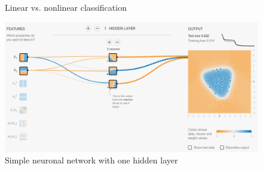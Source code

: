 \documentclass[10pt]{article}
\newcommand{\includetex}[1]{
    \def\svgwidth{\columnwidth}
    {#1.pdf_tex}
}
\newif\ifen
\newif\ifde
\newcommand{\en}[1]{\ifen#1\fi}
\newcommand{\de}[1]{\ifde#1\fi}
\begin{document}
				\begin{figure}[H]
					\begin{center}
						\scalebox{1.0}{\includetex{classification}}
					\end{center}
					\caption{Linear vs. nonlinear classification}
					\label{fig:overview_linear_nonlinear_classification}
				\end{figure}
	
				\de{Für das zweite Problem kann man die Funktion noch anpassen. Für das dritte nichtlineare Problem ist der Klassifikationsraum nicht mehr ausreichend und erfordert einen anderen Algorithmus. Und hier kommen die neuronalen Netze ins Spiel. Ein Tool, um das Trennen von Daten zu visualisieren und die Funktionsweise der einzelnen Layer zu testen ist \url{https://playground.tensorflow.org}\footnote{Neural Network Right Here in Your Browser: \url{https://playground.tensorflow.org}}. Ein nichtlineares Problem kann im einfachsten Fall schon mit einer hinzugefügten versteckten Schicht mit drei weiteren Neuronen gelöst werden:}
				\en{For the second problem one can still adjust the function. For the third nonlinear problem the classification space is no longer sufficient and requires a different algorithm. And this is where the neural networks come into play. A tool to visualize the separation of data and to test the functionality of the individual layers is \url{https://playground.tensorflow.org}\footnote{Neural Network Right Here in Your Browser: \url{https://playground.tensorflow.org}}. In the simplest case, a nonlinear problem can be solved by adding a hidden layer with three additional neurons:}

				\begin{figure}[H]
					\centering
					\includegraphics[width=1.0\textwidth]{images/simple_neuronal_network}
					\caption[Simple neuronal network with one hidden layer]{Simple neuronal network with one hidden layer\footnotemark}
					\label{fig:beispiel4}
				\end{figure}
		
\end{document}
